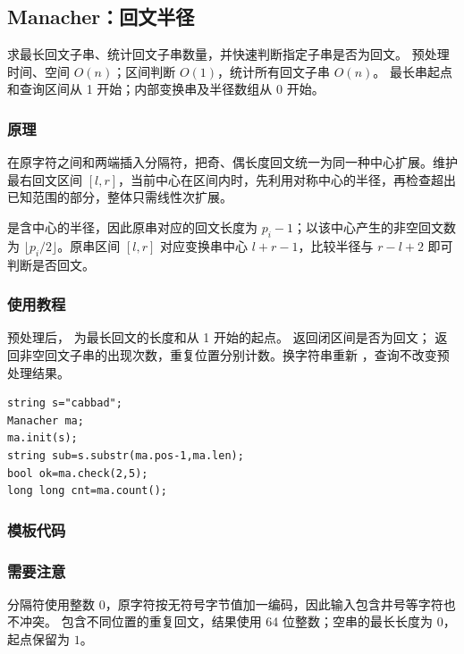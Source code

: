 \subsection{Manacher：回文半径}
\label{algo:manacher}
\AlgorithmInfo
    {求最长回文子串、统计回文子串数量，并快速判断指定子串是否为回文。}
    {预处理时间、空间 $O(n)$；区间判断 $O(1)$，统计所有回文子串 $O(n)$。}
    {最长串起点和查询区间从 1 开始；内部变换串及半径数组从 0 开始。}

\subsubsection*{原理}
在原字符之间和两端插入分隔符，把奇、偶长度回文统一为同一种中心扩展。维护最右回文区间 $[l,r]$，当前中心在区间内时，先利用对称中心的半径，再检查超出已知范围的部分，整体只需线性次扩展。

 是含中心的半径，因此原串对应的回文长度为 $p_i-1$；以该中心产生的非空回文数为 $\lfloor p_i/2\rfloor$。原串区间 $[l,r]$ 对应变换串中心 $l+r-1$，比较半径与 $r-l+2$ 即可判断是否回文。

\subsubsection*{使用教程}
 预处理后， 为最长回文的长度和从 1 开始的起点。 返回闭区间是否为回文； 返回非空回文子串的出现次数，重复位置分别计数。换字符串重新 ，查询不改变预处理结果。
\begin{lstlisting}[style=mtycpp,numbers=none]
string s="cabbad";
Manacher ma;
ma.init(s);
string sub=s.substr(ma.pos-1,ma.len);
bool ok=ma.check(2,5);
long long cnt=ma.count();
\end{lstlisting}

\subsubsection*{模板代码}

\subsubsection*{需要注意}
分隔符使用整数 $0$，原字符按无符号字节值加一编码，因此输入包含井号等字符也不冲突。 包含不同位置的重复回文，结果使用 64 位整数；空串的最长长度为 $0$，起点保留为 $1$。

